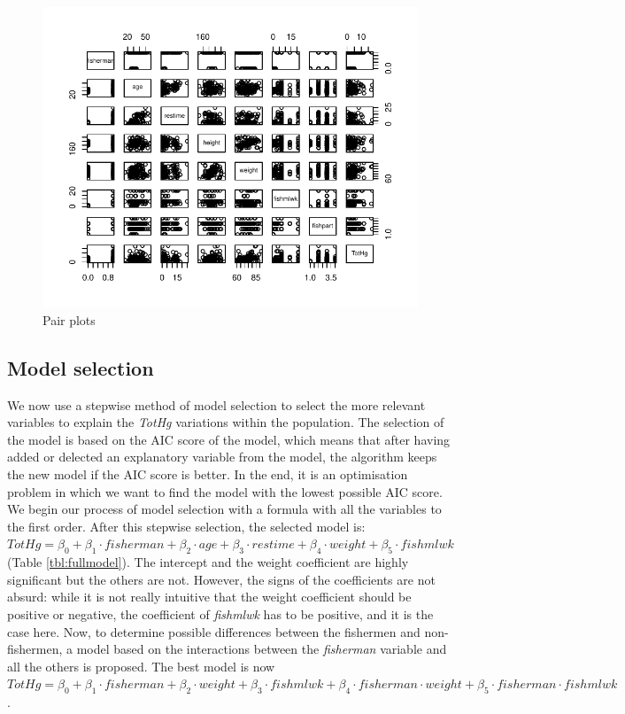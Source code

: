 \documentclass[12pt,]{article}
\begin{document}
\begin{figure}
\centering
\includegraphics{Report_files/figure-latex/unnamed-chunk-8-1.pdf}
\caption{\label{fig:pair_plots}Pair plots}
\end{figure}

\subsection{Model selection}\label{model-selection}

We now use a stepwise method of model selection to select the more
relevant variables to explain the \emph{TotHg} variations within the
population. The selection of the model is based on the AIC score of the
model, which means that after having added or delected an explanatory
variable from the model, the algorithm keeps the new model if the AIC
score is better. In the end, it is an optimisation problem in which we
want to find the model with the lowest possible AIC score. We begin our
process of model selection with a formula with all the variables to the
first order. After this stepwise selection, the selected model is:
\(TotHg = \beta_0 + \beta_1 \cdot fisherman + \beta_2 \cdot age + \beta_3 \cdot restime + \beta_4 \cdot weight + \beta_5 \cdot fishmlwk\)
(Table \ref{tbl:fullmodel}). The intercept and the weight coefficient
are highly significant but the others are not. However, the signs of the
coefficients are not absurd: while it is not really intuitive that the
weight coefficient should be positive or negative, the coefficient of
\emph{fishmlwk} has to be positive, and it is the case here. Now, to
determine possible differences between the fishermen and non-fishermen,
a model based on the interactions between the \emph{fisherman} variable
and all the others is proposed. The best model is now
\(TotHg = \beta_0 + \beta_1 \cdot fisherman + \beta_2 \cdot weight + \beta_3 \cdot fishmlwk + \beta_4 \cdot fisherman \cdot weight + \beta_5 \cdot fisherman \cdot fishmlwk\).
\end{document}
